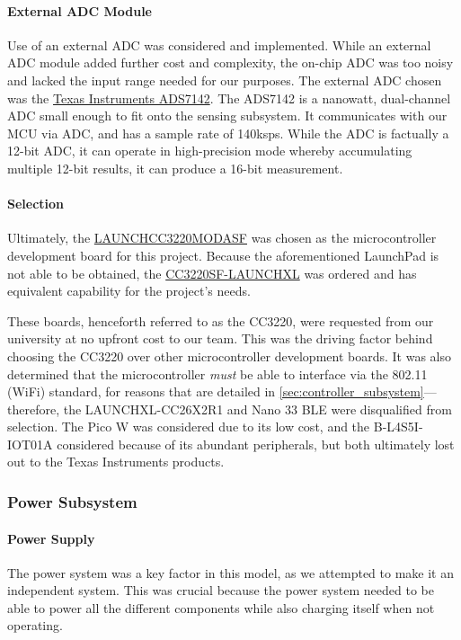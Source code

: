 \paragraph{External ADC Module} Use of an external ADC was considered and implemented. While an external ADC module added further cost and complexity, the on-chip ADC was too noisy and lacked the input range needed for our purposes. The external ADC chosen was the \href{https://www.ti.com/product/ADS7142}{Texas Instruments ADS7142}. The ADS7142 is a nanowatt, dual-channel ADC small enough to fit onto the sensing subsystem. It communicates with our MCU via ADC, and has a sample rate of 140ksps. While the ADC is factually a 12-bit ADC, it can operate in high-precision mode whereby accumulating multiple 12-bit results, it can produce a 16-bit measurement.

\paragraph{Selection} Ultimately, the \href{https://www.ti.com/tool/LAUNCHCC3220MODASF}{LAUNCHCC3220MODASF} was chosen as the microcontroller development board for this project. Because the aforementioned LaunchPad is not able to be obtained, the \href{https://www.ti.com/tool/CC3220SF-LAUNCHXL}{CC3220SF-LAUNCHXL} was ordered and has equivalent capability for the project's needs.

These boards, henceforth referred to as the CC3220, were requested from our university at no upfront cost to our team. This was the driving factor behind choosing the CC3220 over other microcontroller development boards. It was also determined that the microcontroller \emph{must} be able to interface via the 802.11 (WiFi) standard, for reasons that are detailed in \autoref{sec:controller_subsystem}---therefore, the LAUNCHXL-CC26X2R1 and Nano 33 BLE were disqualified from selection. The Pico W was considered due to its low cost, and the B-L4S5I-IOT01A considered because of its abundant peripherals, but both ultimately lost out to the Texas Instruments products.


\subsubsection{Power Subsystem}\label{sec:ps-power}
\paragraph{Power Supply}
The power system was a key factor in this model, as we attempted to make it an independent system. This was crucial because the power system needed to be able to power all the different components while also charging itself when not operating.

